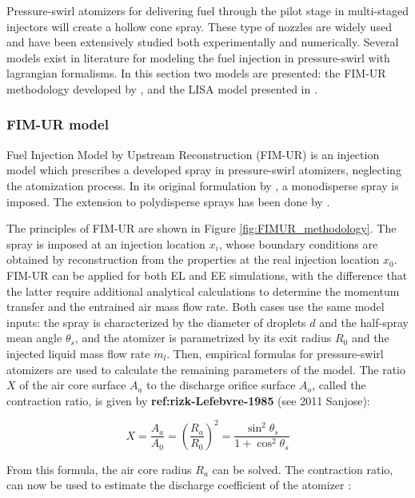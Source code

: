 Pressure-swirl atomizers for delivering fuel through the pilot stage in multi-staged injectors will create a hollow cone spray. These type of nozzles are widely used and have been extensively studied both experimentally and numerically. Several models exist in literature for modeling the fuel injection in pressure-swirl with lagrangian formalisms. In this section two models are presented: the FIM-UR methodology developed by , and the LISA model presented in .


\subsubsection*{FIM-UR model}

Fuel Injection Model by Upstream Reconstruction (FIM-UR) is an injection model which prescribes a developed spray in pressure-swirl atomizers, neglecting the atomization process. In its original formulation by , a monodisperse spray is imposed. The extension to polydisperse sprays has been done by .

The principles of FIM-UR are shown in Figure \ref{fig:FIMUR_methodology}. The spray is imposed at an injection location $x_i$, whose boundary conditions are obtained by reconstruction from the properties at the real injection location $x_0$. FIM-UR can be applied for both EL and EE simulations, with the difference that the latter require additional analytical calculations to determine the momentum transfer and the entrained air mass flow rate. Both cases use the same model inputs: the spray is characterized by the diameter of droplets $d$ and the half-spray mean angle $\theta_s$, and the atomizer is parametrized by its exit radius $R_0$ and the injected liquid mass flow rate $\dot{m}_l$. Then, empirical formulas for pressure-swirl atomizers are used to calculate the remaining parameters of the model. The ratio $X$ of the air core surface $A_a$ to the discharge orifice surface $A_o$, called the contraction ratio, is given by \textbf{ref:rizk-Lefebvre-1985} (see 2011 Sanjose):

\begin{equation}
X = \frac{A_a}{A_0} = \left( \frac{R_a}{R_0} \right)^2 = \frac{\sin^2 \theta_s}{1 + \cos^2 \theta_s}
\end{equation}

From this formula, the air core radius $R_a$ can be solved. The contraction ratio, can now be used to estimate the discharge coefficient of the atomizer :

